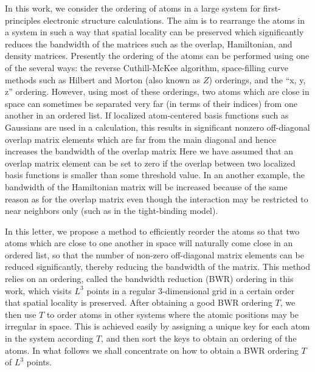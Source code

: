 \documentclass[preprint,showpacs,amssymb,aps]{revtex4}
\begin{document}
In this work, we consider the 
ordering of atoms in a large system for first-principles electronic structure
calculations.  The aim is to rearrange the atoms in a system in such a way
that spatial locality can be preserved which significantly 
reduces the bandwidth of 
the matrices such as the overlap, 
Hamiltonian, and density matrices. 
Presently the ordering of the atoms 
can be performed using one of the several ways:
the reverse Cuthill-McKee algorithm\cite{Cuthill_69,Colombo_96v37}, 
space-filling curve\cite{Sagan_94} methods such as
Hilbert\cite{Bially_69v15,Challacombe_00v128} and Morton (also known as $Z$) 
orderings\cite{Warren_95v87,Omeltchenko_00v131}, and 
the ``x, y, z'' ordering\cite{Canning_96v94}.
However, using most of these orderings, two atoms which are close in space 
can sometimes be separated 
very far (in terms of their indices) from one another in an 
ordered list\cite{Perez_92,Gotsman_96v5}. If localized
atom-centered basis functions such as Gaussians
are used in a calculation, this
results in significant nonzero off-diagonal 
overlap matrix elements which are far 
from the main diagonal
and hence increases the bandwidth of the overlap matrix
Here we have assumed that an overlap matrix element
can be set to zero if the overlap
between two localized basis functions is smaller than some threshold value.
In an another example, the bandwidth of the Hamiltonian matrix 
will be increased because of the same reason as for the overlap matrix
even though the interaction
may be restricted to near neighbors only (such as in the tight-binding
model).

In this letter, we
propose a method to efficiently reorder the atoms so that two atoms
which are close to one another in space will naturally come close in an 
ordered list, so that the number of non-zero off-diagonal matrix elements
can be reduced significantly, thereby reducing the bandwidth of the matrix.
This method relies on an ordering, called the bandwidth reduction (BWR)
ordering in this work, which visits $L^3$ points in a regular 3-dimensional
grid in a certain order that spatial locality is preserved.
After obtaining a good BWR ordering $T$,
we then use $T$
to order atoms in other systems 
where the atomic positions may be irregular in space. 
This is achieved easily\cite{Warren_95v87,Pilkington_96v7}
by assigning a unique key for each atom in the system 
according $T$,
and then sort the keys to obtain an ordering of the atoms.
In what follows we shall concentrate 
on how to obtain a BWR ordering $T$ of $L^3$ points.
\end{document}
